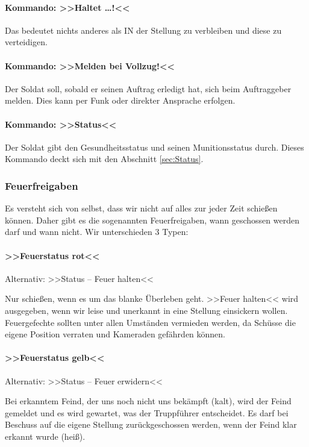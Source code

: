 \paragraph*{Kommando: >>Haltet \dots!<<}
	Das bedeutet nichts anderes als IN der Stellung zu verbleiben und diese zu verteidigen.

\paragraph*{Kommando: >>Melden bei Vollzug!<<}
	Der Soldat soll, sobald er seinen Auftrag erledigt hat, sich beim Auftraggeber melden. Dies kann per Funk oder direkter Ansprache erfolgen.

\paragraph*{Kommando: >>Status<<}
	Der Soldat gibt den Gesundheitsstatus und seinen Munitionsstatus durch. Dieses Kommando deckt sich mit den Abschnitt \ref{sec:Status}.

\subsubsection{Feuerfreigaben}
	Es versteht sich von selbst, dass wir nicht auf alles zur jeder Zeit schießen können. Daher gibt es die sogenannten Feuerfreigaben, wann geschossen werden darf und wann nicht. Wir unterschieden 3 Typen:

\paragraph*{>>Feuerstatus rot<<}
	Alternativ: >>Status -- Feuer halten<<\par
	Nur schießen, wenn es um das blanke Überleben geht. >>Feuer halten<< wird ausgegeben, wenn wir leise und unerkannt in eine Stellung einsickern wollen. Feuergefechte sollten unter allen Umständen vermieden werden, da Schüsse die eigene Position verraten und Kameraden gefährden können.
\paragraph*{>>Feuerstatus gelb<<}
	Alternativ: >>Status -- Feuer erwidern<<\par
	Bei erkanntem Feind, der uns noch nicht uns bekämpft (kalt), wird der Feind gemeldet und es wird gewartet, was der Truppführer entscheidet. Es darf bei Beschuss auf die eigene Stellung zurückgeschossen werden, wenn der Feind klar erkannt wurde (heiß).
